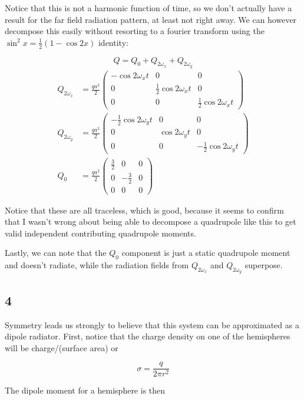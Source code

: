 \documentclass[12pt]{article}
\begin{document}
Notice that this is not a harmonic function of time, so we don't actually have a result for the far field radiation pattern, at least not right away. We can however decompose this easily without resorting to a fourier transform using the \(\sin^2x = \frac{1}{2}(1-\cos2x)\) identity:

\[Q = Q_0 + Q_{2\omega_x} + Q_{2\omega_y}
\]
\begin{align*}
Q_{2\omega_x} &= \frac{qa^2}{2}\left(\begin{array}{ccc}
-\cos 2\omega_x t & 0 & 0 \\
0 & \frac{1}{2}\cos 2\omega_x t & 0 \\
0 & 0 &\frac{1}{2}\cos 2\omega_x t
\end{array}\right) \\[6pt]
%
Q_{2\omega_y} &= \frac{qa^2}{2}\left(\begin{array}{ccc}
-\frac{1}{2}\cos 2\omega_y t & 0 & 0 \\
0 & \cos 2\omega_y t& 0 \\
0 & 0 &-\frac{1}{2}\cos 2\omega_y t
\end{array}\right) \\[6pt]
%
Q_0 &= \frac{qa^2}{2}\left(\begin{array}{ccc}
\frac{3}{2} & 0 & 0 \\
0 & -\frac{3}{2}& 0 \\
0 & 0 &0
\end{array}\right)
\end{align*}

Notice that these are all traceless, which is good, because it seems to confirm that I wasn't wrong about being able to decompose a quadrupole like this to get valid independent contributing quadrupole moments.

Lastly, we can note that the \(Q_0\) component is just a static quadrupole moment and doesn't radiate, while the radiation fields from \(Q_{2\omega_x}\) and \(Q_{2\omega_y}\) superpose. 

\subsection*{4}

Symmetry leads us strongly to believe that this system can be approximated as a dipole radiator. First, notice that the charge density on one of the hemispheres will be charge/(surface area) or

\[ \sigma = \frac{q}{2\pi r^2}
\]

The dipole moment for a hemisphere is then
\end{document}
